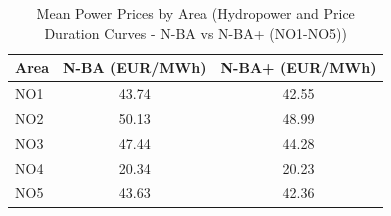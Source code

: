 \begin{table}[htbp]
\centering
\caption{Mean Power Prices by Area (Hydropower and Price Duration Curves - N-BA vs N-BA+ (NO1-NO5))}
\label{tab:mean_prices_NO_areas_N_BA_vs_N_BA_plus}
\begin{tabular}{lcc}
\hline
Area & N-BA (EUR/MWh) & N-BA+ (EUR/MWh) \\
\hline
NO1 & 43.74 & 42.55 \\
NO2 & 50.13 & 48.99 \\
NO3 & 47.44 & 44.28 \\
NO4 & 20.34 & 20.23 \\
NO5 & 43.63 & 42.36 \\
\hline
\end{tabular}
\end{table}